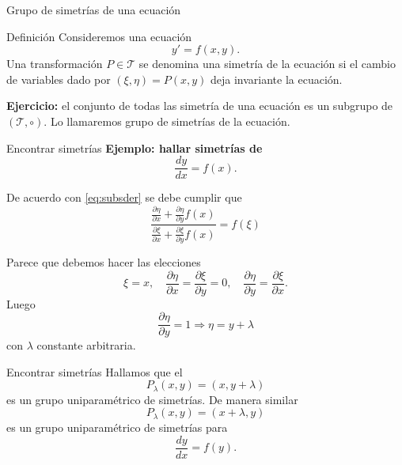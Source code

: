 \documentclass[handout,hyperref={colorlinks=true}]{beamer}
\renewcommand{\emph}[1]{\textcolor[rgb]{1,0,0}{#1}}
\begin{document}
\begin{frame}{Grupo de simetrías de una ecuación}

\begin{block}{Definición}
Consideremos una ecuación
\[y'=f(x,y).\]
Una transformación $P\in \mathscr{T}$ se denomina una simetría de la ecuación si el cambio de variables dado por $(\xi,\eta)=P(x,y)$ deja invariante  la ecuación. 

\textbf{Ejercicio:} el conjunto de todas las simetría de una ecuación es un subgrupo de  $( \mathscr{T},\circ)$. Lo llamaremos \emph{grupo de simetrías} de la ecuación.

 

\end{block}


\end{frame}

 \begin{frame}{Encontrar simetrías}
 \textbf{Ejemplo: hallar simetrías de }
\[\frac{dy}{dx}=f(x).\]

De acuerdo con \eqref{eq:subsder} se debe cumplir que 
 \[\frac{\frac{\partial\eta}{\partial x}+\frac{\partial\eta}{\partial y}f(x)}{\frac{\partial\xi}{\partial x}+\frac{\partial\xi}{\partial y}f(x)}=f(\xi)\]

 Parece que debemos hacer las elecciones
   \[\boxed{\xi=x},\quad \frac{\partial\eta}{\partial x}=\frac{\partial\xi}{\partial y}=0,\quad
   \frac{\partial\eta}{\partial y}=\frac{\partial\xi}{\partial x}. \]
 Luego 
\[\frac{\partial\eta}{\partial y}=1\Rightarrow \boxed{\eta=y+\lambda} \]
con $\lambda$ constante arbitraria.
 \end{frame}

\begin{frame}{Encontrar simetrías}
Hallamos que el 
\[P_{\lambda}(x,y)=(x,y+\lambda)\]
es un grupo uniparamétrico de simetrías. De manera similar
\[P_{\lambda}(x,y)=(x+\lambda,y)\]
es un grupo uniparamétrico de simetrías para 
\[\frac{dy}{dx}=f(y).\]

\end{frame}
\end{document}
